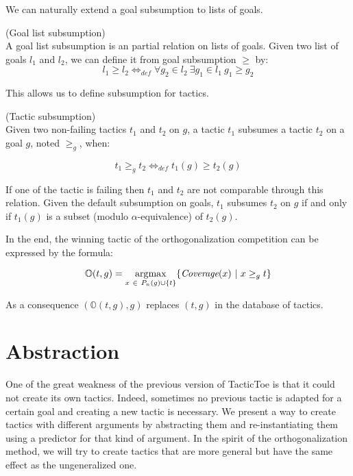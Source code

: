 \documentclass[runningheads,a4paper,draft]{svjour3}
\DeclareMathOperator*{\argmax}{\arg\!\max}
\def\tactictoe{\textsf{TacticToe}\xspace}
\begin{document}
We can naturally extend a goal subsumption to lists of goals.
\begin{definition} (Goal list subsumption)\\
A goal list subsumption is an partial relation on lists of goals.
Given two list of goals $l_1$ and $l_2$, we can define it from goal
subsumption $\ge$ by:
\[l_1 \ge l_2  \Leftrightarrow_{def} \forall g_2 \in l_2\ \exists g_1 \in l_1\
g_1 \ge g_2\]
\end{definition}

This allows us to define subsumption for tactics.
\begin{definition}(Tactic subsumption)\\
Given two non-failing tactics $t_1$ and $t_2$ on $g$, a tactic $t_1$ subsumes a
tactic $t_2$ on a goal $g$, noted $\ge_g$, when:

 \[t_1 \ge_g t_2 \Leftrightarrow_{def} t_1(g) \ge t_2(g)\]

If one of the tactic is failing then $t_1$ and $t_2$ are not comparable through
this relation.
Given the default subsumption on goals, $t_1$ subsumes $t_2$ on $g$ if and only
if $t_1(g)$ is a subset (modulo $\alpha$-equivalence) of $t_2(g)$.
\end{definition}

In the end, the winning tactic of the orthogonalization competition can be
expressed by the formula:

\[\mathbb{O}(t,g) = \argmax_{x\ \in\ P_n(g) \cup \lbrace t \rbrace} \lbrace
\textit{\mbox{Coverage}}(x)\
|\ x \ge_g t\rbrace\]

As a consequence $(\mathbb{O}(t,g),g)$ replaces $(t,g)$ in the database of
tactics.

\section{Abstraction}\label{sec:synthesis}
One of the great weakness of the previous version of \tactictoe is that
it could not create its own tactics. Indeed, sometimes no previous tactic is
adapted for a certain goal and creating a new tactic is necessary.
We present a way to create tactics with different arguments
by abstracting them and re-instantiating them using a predictor for that kind
of argument. In the spirit of the orthogonalization method, we will try to
create tactics that are more general but have the same effect as the
ungeneralized one.
\end{document}
